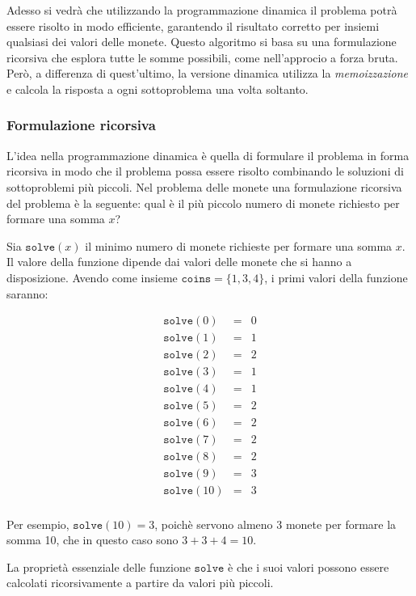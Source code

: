 Adesso si vedrà che utilizzando la
programmazione dinamica il problema 
potrà essere risolto in modo efficiente,
garantendo il risultato corretto 
per insiemi qualsiasi dei valori delle monete.
Questo algoritmo si basa su una formulazione
ricorsiva che esplora tutte le somme possibili,
come nell'approcio a forza bruta.
Però, a differenza di quest'ultimo, la versione
dinamica utilizza la \emph{memoizzazione} e calcola
la risposta a ogni sottoproblema una volta soltanto.

\subsubsection{Formulazione ricorsiva}

L'idea nella programmazione dinamica è quella di 
formulare il problema in forma ricorsiva
in modo che il problema possa essere 
risolto combinando le soluzioni di sottoproblemi
più piccoli.
Nel problema delle monete una formulazione
ricorsiva del problema è la seguente:
qual è il più piccolo numero di monete richiesto per 
formare una somma $x$?

Sia $\texttt{solve}(x)$
il minimo numero di monete richieste per 
formare una somma $x$. Il valore
della funzione dipende dai valori delle monete
che si hanno a disposizione.
Avendo come insieme $\texttt{coins} = \{1,3,4\}$,
i primi valori della funzione saranno:

\[
\begin{array}{lcl}
\texttt{solve}(0) & = & 0 \\
\texttt{solve}(1) & = & 1 \\
\texttt{solve}(2) & = & 2 \\
\texttt{solve}(3) & = & 1 \\
\texttt{solve}(4) & = & 1 \\
\texttt{solve}(5) & = & 2 \\
\texttt{solve}(6) & = & 2 \\
\texttt{solve}(7) & = & 2 \\
\texttt{solve}(8) & = & 2 \\
\texttt{solve}(9) & = & 3 \\
\texttt{solve}(10) & = & 3 \\
\end{array}
\]

Per esempio, $\texttt{solve}(10)=3$,
poichè servono almeno 3 monete per formare
la somma 10, che in questo caso sono $3+3+4=10$.

La proprietà essenziale delle funzione $\texttt{solve}$ 
è che i suoi valori possono essere calcolati
ricorsivamente a partire da valori più piccoli.

